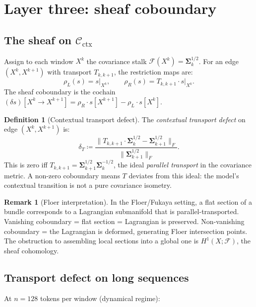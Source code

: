 \documentclass[11pt]{amsart}
\theoremstyle{definition}
\newtheorem{definition}[theorem]{Definition}
\newtheorem{remark}[theorem]{Remark}
\newcommand{\Cctx}{\mathcal{C}_{\!\mathrm{ctx}}}
\newcommand{\defeq}{\coloneqq}
\newcommand{\rhoR}{\rho_R}
\newcommand{\rhoL}{\rho_L}
\newcommand{\cobdry}{\delta}
\begin{document}
\section{Layer three: sheaf coboundary}
\label{sec:sheaf}

\subsection{The sheaf on $\Cctx$}

Assign to each window $X^k$ the covariance stalk
$\mathcal{F}(X^k) = \boldsymbol{\Sigma}_k^{1/2}$.
For an edge $(X^k, X^{k+1})$ with transport $T_{k,k+1}$, the
restriction maps are:
\[
  \rhoL(s) = s\big|_{X^k}, \qquad \rhoR(s) = T_{k,k+1} \cdot s\big|_{X^k}.
\]
The sheaf coboundary is the cochain
$(\cobdry s)[X^k \to X^{k+1}] = \rhoR \cdot s[X^{k+1}] - \rhoL \cdot s[X^k]$.

\begin{definition}[Contextual transport defect]
\label{def:cobdry}
The \emph{contextual transport defect} on edge $(X^k, X^{k+1})$ is:
\[
  \cobdry_T \defeq \frac{\bigl\|T_{k,k+1} \cdot \boldsymbol{\Sigma}_k^{1/2}
  - \boldsymbol{\Sigma}_{k+1}^{1/2}\bigr\|_F}{\bigl\|\boldsymbol{\Sigma}_{k+1}^{1/2}\bigr\|_F}.
\]
This is zero iff $T_{k,k+1} = \boldsymbol{\Sigma}_{k+1}^{1/2}\boldsymbol{\Sigma}_k^{-1/2}$,
the ideal \emph{parallel transport} in the covariance metric.
A non-zero coboundary means $T$ deviates from this ideal:
the model's contextual transition is not a pure covariance isometry.
\end{definition}

\begin{remark}[Floer interpretation]
In the Floer/Fukaya setting, a flat section of a bundle corresponds to
a Lagrangian submanifold that is parallel-transported.
Vanishing coboundary = flat section = Lagrangian is preserved.
Non-vanishing coboundary = the Lagrangian is deformed, generating
Floer intersection points.
The obstruction to assembling local sections into a global one is
$H^1(X; \mathcal{F})$, the sheaf cohomology.
\end{remark}

\subsection{Transport defect on long sequences}

At $n = 128$ tokens per window (dynamical regime):
\end{document}

